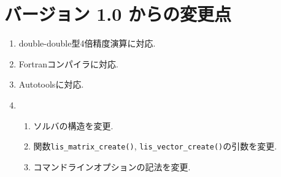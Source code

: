 \documentclass[a4paper]{jarticle}
\begin{document}
\newpage
\section*{バージョン 1.0 からの変更点}
\begin{enumerate}
\item double-double型4倍精度演算に対応.
\item Fortranコンパイラに対応.
\item Autotoolsに対応.
\item 
\begin{enumerate}
\item ソルバの構造を変更.
\item 関数{\tt lis\_matrix\_create()}, {\tt lis\_vector\_create()}の引数を変更.
\item コマンドラインオプションの記法を変更.
\end{enumerate}
\end{enumerate}
\end{document}

